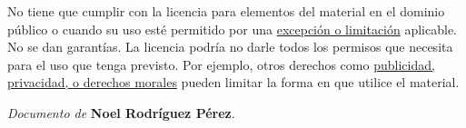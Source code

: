 \noindent No tiene que cumplir con la licencia para elementos del material en el dominio público o cuando su uso esté permitido por una \href{https://creativecommons.org/licenses/by-sa/4.0/deed.es#ref-exception-or-limitation}{excepción o limitación} aplicable.
No se dan garantías. La licencia podría no darle todos los permisos que necesita para el uso que tenga previsto. Por ejemplo, otros derechos como \href{https://creativecommons.org/licenses/by-sa/4.0/deed.es#ref-publicity-privacy-or-moral-rights}{publicidad, privacidad, o derechos morales} pueden limitar la forma en que utilice el material.

\begin{flushright}
		\vspace{3.0 cm}
		\emph{Documento de} \textbf{Noel Rodríguez Pérez}.
\end{flushright}
